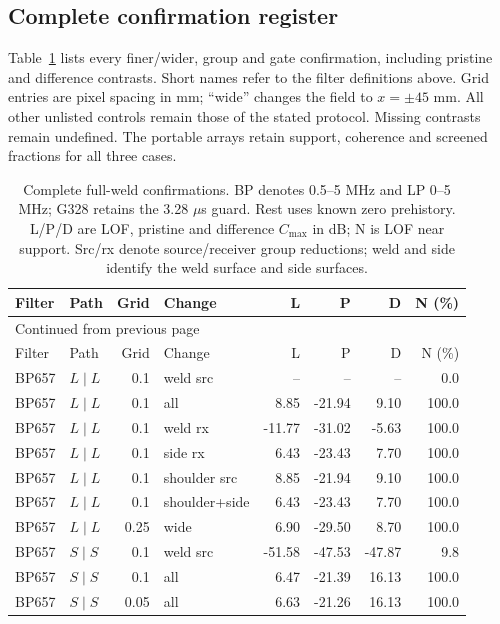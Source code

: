 \documentclass[11pt]{article}
\begin{document}
\subsection{Complete confirmation register}
Table~\ref{saft:archive:full:register} lists every finer/wider, group and gate confirmation, including pristine and difference contrasts. Short names refer to the filter definitions above. Grid entries are pixel spacing in mm; ``wide'' changes the field to $x=\pm45$ mm. All other unlisted controls remain those of the stated protocol. Missing contrasts remain undefined. The portable arrays retain support, coherence and screened fractions for all three cases.
{\small\setlength{\tabcolsep}{4pt}
\singlespacing
\begin{longtable}{@{}llrlrrrr@{}}
\caption{Complete full-weld confirmations. BP denotes 0.5--5 MHz and LP 0--5 MHz; G328 retains the 3.28 $\mu$s guard. Rest uses known zero prehistory. L/P/D are LOF, pristine and difference $C_{\max}$ in dB; N is LOF near support. Src/rx denote source/receiver group reductions; weld and side identify the weld surface and side surfaces.}\label{saft:archive:full:register}\\
\toprule Filter & Path & Grid & Change & L & P & D & N (\%)\\\midrule\endfirsthead
\multicolumn{8}{l}{\small Continued from previous page}\\\toprule Filter & Path & Grid & Change & L & P & D & N (\%)\\\midrule\endhead
\bottomrule\endfoot
BP657 & $L\mid L$ & 0.1 & weld src & -- & -- & -- & 0.0 \\
BP657 & $L\mid L$ & 0.1 & all & 8.85 & -21.94 & 9.10 & 100.0 \\
BP657 & $L\mid L$ & 0.1 & weld rx & -11.77 & -31.02 & -5.63 & 100.0 \\
BP657 & $L\mid L$ & 0.1 & side rx & 6.43 & -23.43 & 7.70 & 100.0 \\
BP657 & $L\mid L$ & 0.1 & shoulder src & 8.85 & -21.94 & 9.10 & 100.0 \\
BP657 & $L\mid L$ & 0.1 & shoulder+side & 6.43 & -23.43 & 7.70 & 100.0 \\
BP657 & $L\mid L$ & 0.25 & wide & 6.90 & -29.50 & 8.70 & 100.0 \\
BP657 & $S\mid S$ & 0.1 & weld src & -51.58 & -47.53 & -47.87 & 9.8 \\
BP657 & $S\mid S$ & 0.1 & all & 6.47 & -21.39 & 16.13 & 100.0 \\
BP657 & $S\mid S$ & 0.05 & all & 6.63 & -21.26 & 16.13 & 100.0 \\

\end{longtable}}
\end{document}
